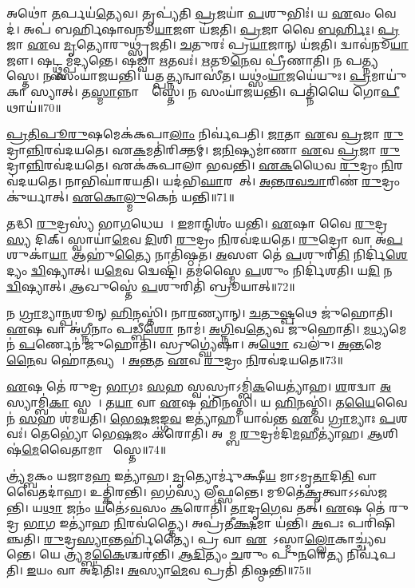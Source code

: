 𑌅𑌥𑍋॑ \ul{𑌤}𑌰𑍍𑌪𑌯॑\ul{𑌤𑍍𑌯𑍇}𑌵।
𑌤𑍃𑌪𑍍𑌯॑𑌤𑌿 \ul{𑌪𑍍𑌰}𑌜𑌯𑌾॑ \ul{𑌪}𑌶𑍁𑌭𑌿𑌃॑।
𑌯 \ul{𑌏}𑌵𑌂 𑌵𑍇𑌦॑।
𑌅𑌪॑ 𑌬𑌰𑍍\mbox{}𑌹𑌿𑌷𑌾𑌵𑌨𑍂\ul{𑌯𑌾}𑌜𑍗 𑌯॑𑌜𑌤𑌿।
\ul{𑌪𑍍𑌰}𑌜𑌾 𑌵𑍈 \ul{𑌬}\ul{𑌰𑍍}𑌹𑌿𑌃।
\ul{𑌪𑍍𑌰}𑌜𑌾 \ul{𑌏}𑌵 \ul{𑌮𑍃}𑌤𑍍𑌯𑍋𑌰𑍁𑌥𑍍𑌸𑍃॑𑌜𑌤𑌿।
\ul{𑌚}𑌤𑍁𑌰𑌃॑ 𑌪𑍍𑌰\ul{𑌯𑌾}𑌜𑌾𑌨𑍍 𑌯॑𑌜𑌤𑌿।
𑌦𑍍𑌵𑌾𑌵॑𑌨𑍂\ul{𑌯𑌾}𑌜𑍗।
𑌷𑌟𑍍𑌥𑍍𑌸𑌮𑍍𑌪॑𑌦𑍍𑌯𑌨𑍍𑌤𑍇।
𑌷𑌡𑍍𑌵𑌾 \ul{𑌋}𑌤𑌵𑌃॑।
\ul{𑌋}𑌤𑍂\ul{𑌨𑍇}𑌵 𑌪𑍍𑌰𑍀॑𑌣𑌾𑌤𑌿।
𑌨 𑌪𑌤𑍍𑌨𑍍𑌯𑌨𑍍𑌵𑌾᳚𑌸𑍍𑌤𑍇।
𑌨 𑌸𑌂𑌯𑌾॑𑌜𑌯𑌨𑍍𑌤𑌿।
𑌯𑌤𑍍𑌪\ul{𑌤𑍍𑌨𑍍𑌯}𑌨𑍍𑌵𑌾𑌸𑍀॑𑌤।
𑌯𑌥𑍍𑌸𑌂॑\ul{𑌯𑌾}𑌜𑌯𑍇॑𑌯𑍁𑌃।
\ul{𑌪𑍍𑌰}𑌮𑌾𑌯𑍁॑𑌕𑌾 𑌸𑍍𑌯𑌾𑌤𑍍।
𑌤\ul{𑌸𑍍𑌮𑌾}𑌨𑍍𑌨𑌾𑌨𑍍𑌵𑌾᳚𑌸𑍍𑌤𑍇।
𑌨 𑌸𑌂𑌯𑌾॑𑌜𑌯𑌨𑍍𑌤𑌿।
𑌪𑌤𑍍𑌨𑌿॑𑌯𑍈 𑌗𑍋\ul{𑌪𑍀}𑌥𑌾𑌯॑॥70॥\anuvakamend[𑌹𑍋𑌤𑌾॑\ul{𑌰}𑌮𑌾𑌜𑍍𑌯॑𑌭𑌾𑌗𑍗 𑌯𑌜\ul{𑌤𑌿} 𑌸𑌨𑍍𑌤॑\ul{𑌤}𑌮𑌵॑𑌦𑍍𑌯\ul{𑌤𑌿} 𑌵𑍍𑌯𑌾𑌵𑍃॑𑌤𑍍𑌤𑍍𑌯𑍈 𑌬𑌰𑍍\mbox{}\ul{𑌹𑌿}𑌷𑌦𑍋॑ 𑌯𑌜\ul{𑌤𑌿} 𑌤\ul{𑌮𑍇}𑌵 𑌤𑌦𑍍𑌯॑\ul{𑌜}𑌤𑍍𑌯\ul{𑌨𑍁} 𑌨𑌿𑌷𑍍𑌕𑍍𑌰𑌾॑𑌮𑌨𑍍𑌤𑍍𑌯𑌾𑌹𑍈𑌨𑌾\ul{𑌨𑍃}𑌤\ul{𑌵𑍋} 𑌨𑌵॑ 𑌚]

\ul{𑌪𑍍𑌰}\ul{𑌤𑌿}\ul{𑌪𑍂}\ul{𑌰𑍁}𑌷𑌮𑍇𑌕॑𑌕𑌪𑌾\ul{𑌲𑌾𑌂} 𑌨𑌿𑌰𑍍𑌵॑𑌪𑌤𑌿।
\ul{𑌜𑌾}𑌤𑌾 \ul{𑌏}𑌵 \ul{𑌪𑍍𑌰}𑌜𑌾 \ul{𑌰𑍁}𑌦𑍍𑌰𑌾\ul{𑌨𑍍𑌨𑌿}𑌰𑌵॑𑌦𑌯𑌤𑍇।
𑌏\ul{𑌕}𑌮𑌤𑌿॑𑌰𑌿𑌕𑍍𑌤𑌮𑍍।
\ul{𑌜}\ul{𑌨𑌿}𑌷𑍍𑌯𑌮𑌾॑𑌣𑌾 \ul{𑌏}𑌵 \ul{𑌪𑍍𑌰}𑌜𑌾 \ul{𑌰𑍁}𑌦𑍍𑌰𑌾\ul{𑌨𑍍𑌨𑌿}𑌰𑌵॑𑌦𑌯𑌤𑍇।
𑌏𑌕॑𑌕𑌪𑌾𑌲𑌾 𑌭𑌵𑌨𑍍𑌤𑌿।
\ul{𑌏}\ul{𑌕}𑌧𑍈𑌵 \ul{𑌰𑍁}𑌦𑍍𑌰𑌂 \ul{𑌨𑌿}𑌰𑌵॑𑌦𑌯𑌤𑍇।
𑌨𑌾𑌭𑌿𑌘𑌾॑𑌰𑌯𑌤𑌿।
𑌯𑌦॑𑌭𑌿\ul{𑌘𑌾}𑌰𑌯𑍇᳚𑌤𑍍।
\ul{𑌅}\ul{𑌨𑍍𑌤}\ul{𑌰}\ul{𑌵}\ul{𑌚𑌾}𑌰𑌿𑌣॑ \ul{𑌰𑍁}𑌦𑍍𑌰𑌂 𑌕𑍁॑𑌰𑍍𑌯𑌾𑌤𑍍।
\ul{𑌏}\ul{𑌕𑍋}\ul{𑌲𑍍𑌮𑍁}𑌕𑍇𑌨॑ 𑌯𑌨𑍍𑌤𑌿॥71॥

𑌤𑌦𑍍𑌧𑌿 \ul{𑌰𑍁}𑌦𑍍𑌰𑌸𑍍𑌯॑ 𑌭𑌾\ul{𑌗}𑌧𑍇𑌯𑌮𑍍᳚।
\ul{𑌇}𑌮𑌾𑌨𑍍𑌦𑌿𑌶𑌂॑ 𑌯𑌨𑍍𑌤𑌿।
\ul{𑌏}𑌷𑌾 𑌵𑍈 \ul{𑌰𑍁}𑌦𑍍𑌰\ul{𑌸𑍍𑌯} 𑌦𑌿𑌕𑍍।
𑌸𑍍𑌵𑌾𑌯𑌾॑\ul{𑌮𑍇}𑌵 \ul{𑌦𑌿}𑌶𑌿 \ul{𑌰𑍁}𑌦𑍍𑌰𑌂 \ul{𑌨𑌿}𑌰𑌵॑𑌦𑌯𑌤𑍇।
\ul{𑌰𑍁}𑌦𑍍𑌰𑍋 𑌵𑌾 𑌅॑\ul{𑌪}𑌶𑍁𑌕𑌾॑\ul{𑌯𑌾} 𑌆𑌹𑍁॑\ul{𑌤𑍍𑌯𑍈} 𑌨𑌾𑌤𑌿॑𑌷𑍍𑌠𑌤।
\ul{𑌅}𑌸𑍗 𑌤𑍇॑ \ul{𑌪}𑌶𑍁𑌰𑌿\ul{𑌤𑌿} 𑌨𑌿𑌰𑍍𑌦𑌿॑\ul{𑌶𑍇}𑌦𑍍𑌯𑌂 \ul{𑌦𑍍𑌵𑌿}𑌷𑍍𑌯𑌾𑌤𑍍।
𑌯\ul{𑌮𑍇}𑌵 𑌦𑍍𑌵𑍇𑌷𑍍𑌟𑌿॑।
𑌤𑌮॑𑌸𑍍𑌮𑍈 \ul{𑌪}𑌶𑍁𑌂 𑌨𑌿𑌰𑍍𑌦𑌿॑𑌶𑌤𑌿।
𑌯\ul{𑌦𑌿} 𑌨 \ul{𑌦𑍍𑌵𑌿}𑌷𑍍𑌯𑌾𑌤𑍍।
\ul{𑌆}𑌖𑍁𑌸𑍍𑌤𑍇॑ \ul{𑌪}𑌶𑍁𑌰𑌿𑌤𑌿॑ 𑌬𑍍𑌰𑍂𑌯𑌾𑌤𑍍॥72॥

𑌨 \ul{𑌗𑍍𑌰𑌾}𑌮𑍍𑌯𑌾\ul{𑌨𑍍𑌪}𑌶𑍂𑌨𑍍 \ul{𑌹𑌿}𑌨𑌸𑍍𑌤𑌿॑।
𑌨𑌾\ul{𑌰}𑌣𑍍𑌯𑌾𑌨𑍍।
\ul{𑌚}\ul{𑌤𑍁}\ul{𑌷𑍍𑌪}𑌥𑍇 𑌜𑍁॑𑌹𑍋𑌤𑌿।
\ul{𑌏}𑌷 𑌵𑌾 𑌅॑\ul{𑌗𑍍𑌨𑍀}𑌨𑌾𑌂 𑌪𑌡𑍍𑌬𑍀॑\ul{𑌶𑍋} 𑌨𑌾𑌮॑।
\ul{𑌅}\ul{𑌗𑍍𑌨𑌿}𑌵\ul{𑌤𑍍𑌯𑍇}𑌵 𑌜𑍁॑𑌹𑍋𑌤𑌿।
\ul{𑌮}\ul{𑌧𑍍𑌯}𑌮𑍇𑌨॑ \ul{𑌪}𑌰𑍍𑌣𑍇𑌨॑ 𑌜𑍁𑌹𑍋𑌤𑌿।
𑌸𑍍𑌰𑍁𑌗𑍍𑌘𑍍𑌯𑍇॑𑌷𑌾।
𑌅\ul{𑌥𑍋} 𑌖𑌲𑍁॑।
\ul{𑌅}\ul{𑌨𑍍𑌤}𑌮𑍇\ul{𑌨𑍈}𑌵 𑌹𑍋॑\ul{𑌤}𑌵𑍍𑌯𑌮𑍍᳚।
\ul{𑌅}\ul{𑌨𑍍𑌤}𑌤 \ul{𑌏}𑌵 \ul{𑌰𑍁}𑌦𑍍𑌰𑌂 \ul{𑌨𑌿}𑌰𑌵॑𑌦𑌯𑌤𑍇॥73॥

\ul{𑌏}𑌷 𑌤𑍇॑ 𑌰𑍁𑌦𑍍𑌰 \ul{𑌭𑌾}𑌗𑌃 \ul{𑌸}𑌹 𑌸𑍍𑌵𑌸𑍍𑌰𑌾\-𑌽𑌮𑍍𑌬𑌿॑\ul{𑌕}𑌯𑍇𑌤𑍍𑌯𑌾॑𑌹।
\ul{𑌶}𑌰𑌦𑍍𑌵𑌾 \ul{𑌅}𑌸𑍍𑌯𑌾𑌮𑍍𑌬𑌿॑\ul{𑌕𑌾} 𑌸𑍍𑌵𑌸𑌾᳚।
𑌤\ul{𑌯𑌾} 𑌵𑌾 \ul{𑌏}𑌷 𑌹𑌿॑𑌨𑌸𑍍𑌤𑌿।
𑌯 \ul{𑌹𑌿}𑌨𑌸𑍍𑌤𑌿॑।
𑌤\ul{𑌯𑍈}𑌵𑍈𑌨॑ \ul{𑌸}𑌹 𑌶॑𑌮𑌯𑌤𑌿।
\ul{𑌭𑍇}\ul{𑌷}𑌜𑌙𑍍𑌗\ul{𑌵} 𑌇𑌤𑍍𑌯𑌾॑𑌹।
𑌯𑌾𑌵॑𑌨𑍍𑌤 \ul{𑌏}𑌵 \ul{𑌗𑍍𑌰𑌾}𑌮𑍍𑌯𑌾𑌃 \ul{𑌪}𑌶𑌵𑌃॑।
𑌤𑍇𑌭𑍍𑌯𑍋॑ 𑌭𑍇\ul{𑌷}𑌜𑌂 𑌕॑𑌰𑍋𑌤𑌿।
𑌅𑌵𑌾᳚𑌮𑍍𑌬 \ul{𑌰𑍁}𑌦𑍍𑌰𑌮॑𑌦𑌿\ul{𑌮}𑌹𑍀𑌤𑍍𑌯𑌾॑𑌹।
\ul{𑌆}𑌶𑌿𑌷॑\ul{𑌮𑍇}𑌵𑍈𑌤𑌾𑌮𑌾 𑌶𑌾᳚𑌸𑍍𑌤𑍇॥74॥

𑌤𑍍𑌰𑍍𑌯॑𑌮𑍍𑌬𑌕𑌂 𑌯𑌜𑌾𑌮\ul{𑌹} 𑌇𑌤𑍍𑌯𑌾॑𑌹।
\ul{𑌮𑍃}𑌤𑍍𑌯𑍋𑌰𑍍𑌮𑍁॑𑌕𑍍𑌷𑍀\ul{𑌯} 𑌮𑌾𑌽𑌮𑍃\ul{𑌤𑌾}𑌦𑌿\ul{𑌤𑌿} 𑌵𑌾𑌵𑍈𑌤𑌦𑌾॑𑌹।
𑌉𑌤𑍍𑌕𑌿॑𑌰𑌨𑍍𑌤𑌿।
𑌭𑌗॑𑌸𑍍𑌯 𑌲𑍀𑌫𑍍𑌸𑌨𑍍𑌤𑍇।
𑌮𑍂𑌤𑍇॑\ul{𑌕𑍃}𑌤𑍍𑌵𑌾\-𑌽𑌽𑌸॑𑌜𑌨𑍍𑌤𑌿।
𑌯\ul{𑌥𑌾} 𑌜𑌨𑌂॑ \ul{𑌯}𑌤𑍇॑\-𑌽\ul{𑌵}𑌸𑌂 \ul{𑌕}𑌰𑍋𑌤𑌿॑।
\ul{𑌤𑌾}𑌦𑍃\ul{𑌗𑍇}𑌵 𑌤𑌤𑍍।
\ul{𑌏}𑌷 𑌤𑍇॑ 𑌰𑍁𑌦𑍍𑌰 \ul{𑌭𑌾}𑌗 𑌇𑌤𑍍𑌯𑌾॑𑌹 \ul{𑌨𑌿}𑌰𑌵॑𑌤𑍍𑌤𑍍𑌯𑍈।
𑌅𑌪𑍍𑌰॑𑌤𑍀\ul{𑌕𑍍𑌷}𑌮𑌾 𑌯॑𑌨𑍍𑌤𑌿।
\ul{𑌅}𑌪𑌃 𑌪𑌰𑌿॑𑌷𑌿𑌞𑍍𑌚𑌤𑌿।
\ul{𑌰𑍁}𑌦𑍍𑌰\ul{𑌸𑍍𑌯𑌾}𑌨𑍍𑌤𑌰𑍍\mbox{}𑌹𑌿॑𑌤𑍍𑌯𑍈।
𑌪𑍍𑌰 𑌵𑌾 \ul{𑌏}𑌤𑍇᳚\-𑌽𑌸𑍍𑌮𑌾\ul{𑌲𑍍𑌲𑍋}𑌕𑌾𑌚𑍍𑌚𑍍𑌯॑𑌵𑌨𑍍𑌤𑍇।
𑌯𑍇 𑌤𑍍𑌰𑍍𑌯॑𑌮𑍍𑌬\ul{𑌕𑍈}𑌶𑍍𑌚𑌰॑𑌨𑍍𑌤𑌿।
\ul{𑌆}\ul{𑌦𑌿}𑌤𑍍𑌯𑌂 \ul{𑌚}𑌰𑍁𑌂 𑌪𑍁\ul{𑌨}𑌰𑍇\ul{𑌤𑍍𑌯} 𑌨𑌿𑌰𑍍𑌵॑𑌪𑌤𑌿।
\ul{𑌇}𑌯𑌂 𑌵𑌾 𑌅𑌦𑌿॑𑌤𑌿𑌃।
\ul{𑌅}𑌸𑍍𑌯𑌾\ul{𑌮𑍇}𑌵 𑌪𑍍𑌰𑌤𑌿॑ 𑌤𑌿𑌷𑍍𑌠𑌨𑍍𑌤𑌿॥75॥\anuvakamend[\ul{𑌯}\ul{𑌨𑍍𑌤𑌿} \ul{𑌬𑍍𑌰𑍂}\ul{𑌯𑌾}\ul{𑌨𑍍𑌨𑌿}𑌰𑌵॑𑌦𑌯𑌤𑍇 𑌶𑌾𑌸𑍍𑌤𑍇 𑌸𑌿𑌞𑍍𑌚\ul{𑌤𑌿} 𑌷𑌟𑍍𑌚॑]




